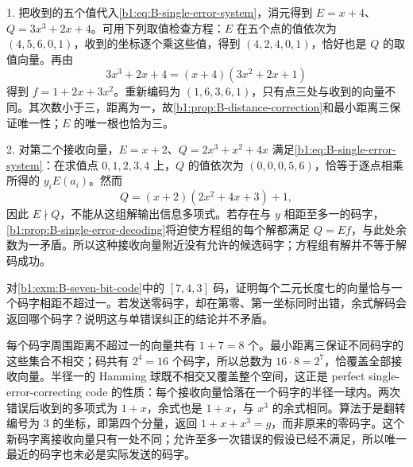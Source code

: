 \begin{solution}
	1. 把收到的五个值代入\eqref{b1:eq:B-single-error-system}，消元得到 \(E=x+4\)、\(Q=3x^3+2x+4\)。可用下列取值检查方程：\(E\) 在五个点的值依次为 \((4,5,6,0,1)\)，收到的坐标逐个乘这些值，得到 \((4,2,4,0,1)\)，恰好也是 \(Q\) 的取值向量。再由
	\[
		3x^3+2x+4=(x+4)(3x^2+2x+1)
	\]
	得到 \(f=1+2x+3x^2\)。重新编码为 \((1,6,3,6,1)\)，只有点三处与收到的向量不同。其次数小于三，距离为一，故\cref{b1:prop:B-distance-correction}和最小距离三保证唯一性；\(E\) 的唯一根也恰为三。

	2. 对第二个接收向量，\(E=x+2\)、\(Q=2x^3+x^2+4x\) 满足\eqref{b1:eq:B-single-error-system}：在求值点 \(0,1,2,3,4\) 上，\(Q\) 的值依次为 \((0,0,0,5,6)\)，恰等于逐点相乘所得的 \(y_iE(a_i)\)。然而
	\[
		Q=(x+2)(2x^2+4x+3)+1,
	\]
	因此 \(E\nmid Q\)，不能从这组解输出信息多项式。若存在与 \(y\) 相距至多一的码字，\cref{b1:prop:B-single-error-decoding}将迫使方程组的每个解都满足 \(Q=Ef\)，与此处余数为一矛盾。所以这种接收向量附近没有允许的候选码字；方程组有解并不等于解码成功。
\end{solution}


\begin{exercise}\label{b1:ex:B-seven-bit-radius}
	对\cref{b1:exm:B-seven-bit-code}中的 \([7,4,3]\) 码，证明每个二元长度七的向量恰与一个码字相距不超过一。若发送零码字，却在第零、第一坐标同时出错，余式解码会返回哪个码字？说明这与单错误纠正的结论并不矛盾。
\end{exercise}
\begin{solution}
	每个码字周围距离不超过一的向量共有 \(1+7=8\) 个。最小距离三保证不同码字的这些集合不相交；码共有 \(2^4=16\) 个码字，所以总数为 \(16\cdot8=2^7\)，恰覆盖全部接收向量。半径一的 Hamming 球既不相交又覆盖整个空间，这正是 perfect single-error-correcting code 的性质：每个接收向量恰落在一个码字的半径一球内。两次错误后收到的多项式为 \(1+x\)，余式也是 \(1+x\)，与 \(x^3\) 的余式相同。算法于是翻转编号为 \(3\) 的坐标，即第四个分量，返回 \(1+x+x^3=g\)，而非原来的零码字。这个新码字离接收向量只有一处不同；允许至多一次错误的假设已经不满足，所以唯一最近的码字也未必是实际发送的码字。
\end{solution}
